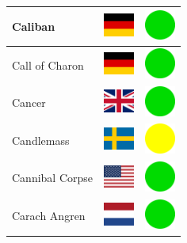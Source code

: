 \documentclass[12pt, a4paper, twoside]{report}
\begin{document}
\begin{center}
\begin{longtable}{|p{5cm}|p{2cm}|p{2cm}|}
 Caliban                                                    & \includegraphics[width=1cm]{../4x3/de} &   \includegraphics[width=1cm]{../likes/y} \\ \hline
 Call of Charon                                             & \includegraphics[width=1cm]{../4x3/de} &   \includegraphics[width=1cm]{../likes/y} \\ \hline
 Cancer                                                     & \includegraphics[width=1cm]{../4x3/gb} &   \includegraphics[width=1cm]{../likes/y} \\ \hline
 Candlemass                                                 & \includegraphics[width=1cm]{../4x3/se} &   \includegraphics[width=1cm]{../likes/m} \\ \hline
 Cannibal Corpse                                            & \includegraphics[width=1cm]{../4x3/us} &   \includegraphics[width=1cm]{../likes/y} \\ \hline
 Carach Angren                                              & \includegraphics[width=1cm]{../4x3/nl} &   \includegraphics[width=1cm]{../likes/y} \\ \hline

\end{longtable}
\end{center}
\end{document}
